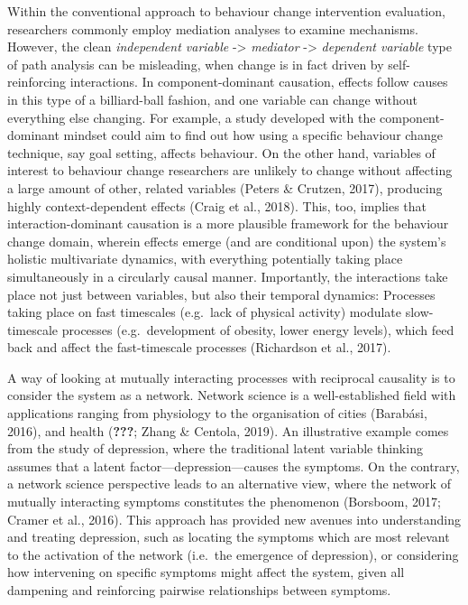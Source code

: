 \documentclass[
  british,
  man,floatsintext]{apa6}
\begin{document}
Within the conventional approach to behaviour change intervention evaluation, researchers commonly employ mediation analyses to examine mechanisms. However, the clean \emph{independent variable} -\textgreater{} \emph{mediator} -\textgreater{} \emph{dependent variable} type of path analysis can be misleading, when change is in fact driven by self-reinforcing interactions. In component-dominant causation, effects follow causes in this type of a billiard-ball fashion, and one variable can change without everything else changing. For example, a study developed with the component-dominant mindset could aim to find out how using a specific behaviour change technique, say goal setting, affects behaviour. On the other hand, variables of interest to behaviour change researchers are unlikely to change without affecting a large amount of other, related variables (Peters \& Crutzen, 2017), producing highly context-dependent effects (Craig et al., 2018). This, too, implies that interaction-dominant causation is a more plausible framework for the behaviour change domain, wherein effects emerge (and are conditional upon) the system's holistic multivariate dynamics, with everything potentially taking place simultaneously in a circularly causal manner. Importantly, the interactions take place not just between variables, but also their temporal dynamics: Processes taking place on fast timescales (e.g.~lack of physical activity) modulate slow-timescale processes (e.g.~development of obesity, lower energy levels), which feed back and affect the fast-timescale processes (Richardson et al., 2017).

A way of looking at mutually interacting processes with reciprocal causality is to consider the system as a network. Network science is a well-established field with applications ranging from physiology to the organisation of cities (Barabási, 2016), and health ({\textbf{???}}; Zhang \& Centola, 2019). An illustrative example comes from the study of depression, where the traditional latent variable thinking assumes that a latent factor---depression---causes the symptoms. On the contrary, a network science perspective leads to an alternative view, where the network of mutually interacting symptoms constitutes the phenomenon (Borsboom, 2017; Cramer et al., 2016). This approach has provided new avenues into understanding and treating depression, such as locating the symptoms which are most relevant to the activation of the network (i.e.~the emergence of depression), or considering how intervening on specific symptoms might affect the system, given all dampening and reinforcing pairwise relationships between symptoms.
\end{document}
